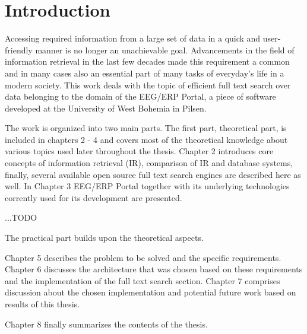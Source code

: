 
\chapter{Introduction}

Accessing required information from a large set of data in a quick
and user-friendly manner is no longer an unachievable goal. Advancements
in the field of information retrieval in the last few decades made
this requirement a common and in many cases also an essential part
of many tasks of everyday's life in a modern society. This work deals
with the topic of efficient full text search over data belonging to
the domain of the EEG/ERP Portal, a piece of software developed at
the University of West Bohemia in Pilsen. 

The work is organized into two main parts. The first part, theoretical
part, is included in chapters 2 - 4 and covers most of the theoretical
knowledge about various topics used later throughout the thesis. Chapter 2 introduces
core concepts of information retrieval (IR), comparison of IR and
database systems, finally, several available open source full text
search engines are described here as well. In Chapter 3 EEG/ERP Portal
together with its underlying technologies corrently used for its development
are presented. 

...TODO

The practical part builds upon the theoretical aspects.

Chapter 5 describes the problem to be solved and the specific requirements.
Chapter 6 discusses the architecture that was chosen based on these
requirements and the implementation of the full text search section.
Chapter 7 comprises discussion about the chosen implementation and
potential future work based on results of this thesis.

Chapter 8 finally summarizes the contents of the thesis.
